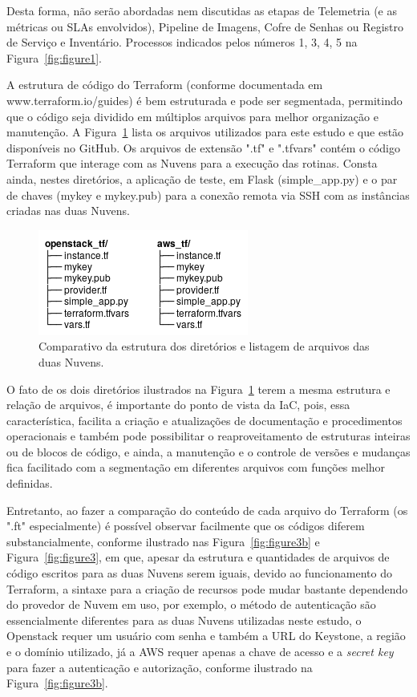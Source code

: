 \documentclass[12pt]{article}
\begin{document}
	Desta forma, não serão abordadas nem discutidas as etapas de Telemetria	(e as métricas ou SLAs envolvidos), Pipeline de Imagens, Cofre de Senhas ou Registro de Serviço e Inventário. Processos indicados pelos números 1, 3, 4, 5 na Figura~\ref{fig:figure1}.
	
	A estrutura de código do Terraform (conforme documentada em www.terraform.io/guides) é bem estruturada e pode ser segmentada, permitindo que o código seja dividido em múltiplos arquivos para melhor organização e manutenção. A Figura~\ref{fig:figure3a} lista os arquivos utilizados para este estudo e que estão disponíveis no GitHub. Os arquivos de extensão ".tf" e ".tfvars" contém o código Terraform que interage com as Nuvens para a execução das rotinas. Consta ainda, nestes diretórios, a aplicação de teste, em Flask (simple\_app.py) e o par de chaves (mykey e mykey.pub) para a conexão remota via SSH com as instâncias criadas nas duas Nuvens.  
	
	\begin{figure}[ht]
		\centering
		\includegraphics[width=0.42\linewidth]{figuras/Figure3a.png}
		\caption{Comparativo da estrutura dos diretórios e listagem de arquivos das duas Nuvens.}
		\label{fig:figure3a}
	\end{figure}
	
	O fato de os dois diretórios ilustrados na Figura~\ref{fig:figure3a} terem a mesma estrutura e relação de arquivos, é importante do ponto de vista da IaC, pois, essa característica, facilita a criação e atualizações de documentação e procedimentos operacionais e também pode possibilitar o reaproveitamento de estruturas inteiras ou de blocos de código, e ainda, a manutenção e o controle de versões e mudanças fica facilitado com a segmentação em diferentes arquivos com funções melhor definidas.  
	
	Entretanto, ao fazer a comparação do conteúdo de cada arquivo do Terraform (os ".ft" especialmente) é possível observar facilmente que os códigos diferem substancialmente, conforme ilustrado nas Figura~\ref{fig:figure3b} e Figura~\ref{fig:figure3}, em que, apesar da estrutura e quantidades de arquivos de código escritos para as duas Nuvens serem iguais, devido ao funcionamento do Terraform, a sintaxe para a criação de recursos pode mudar bastante dependendo do provedor de Nuvem em uso, por exemplo, o método de autenticação são essencialmente diferentes para as duas Nuvens utilizadas neste estudo, o Openstack requer um usuário com senha e também a URL do Keystone, a região e o domínio utilizado, já a AWS requer apenas a chave de acesso e a \textit{secret key} para fazer a autenticação e autorização, conforme ilustrado na Figura~\ref{fig:figure3b}. 
		
\end{document}
